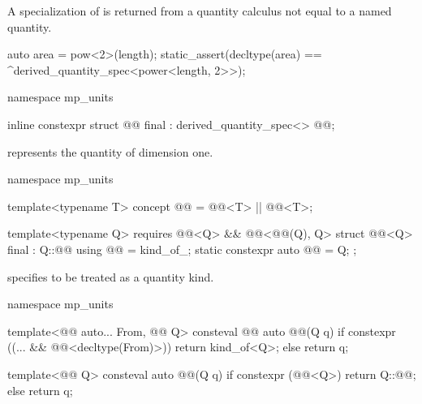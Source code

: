 \pnum
A specialization of 
is returned from a quantity calculus not equal to a named quantity.
\begin{example}
\begin{codeblock}
auto area = pow<2>(length);
static_assert(decltype(area) == ^derived_quantity_spec<power<length, 2>>);
\end{codeblock}
\end{example}

\begin{codeblock}
namespace mp_units {

inline constexpr struct @@ final : derived_quantity_spec<> {
} @@;

}
\end{codeblock}

\pnum
{} represents the quantity of dimension one.

\begin{codeblock}
namespace mp_units {

template<typename T>
concept @@ = @@<T> || @@<T>;

template<typename Q>
  requires @@<Q> && @@<@@(Q{}), Q{}>
struct @@<Q> final : Q::@@ {
  using @@ = kind_of_;
  static constexpr auto @@ = Q{};
};

}
\end{codeblock}

\pnum
{} specifies  to be treated as a quantity kind.

\begin{codeblock}
namespace mp_units {

template<@@ auto... From, @@ Q>
consteval @@ auto @@(Q q)
{
  if constexpr ((... && @@<decltype(From)>))
    return kind_of<Q{}>;
  else
    return q;
}

template<@@ Q>
consteval auto @@(Q q)
{
  if constexpr (@@<Q>)
    return Q::@@;
  else
    return q;
}

}
\end{codeblock}


